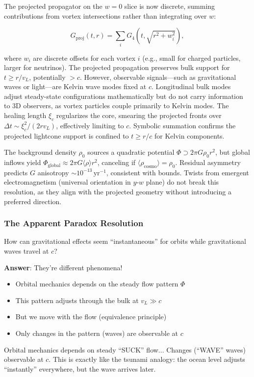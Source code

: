 The projected propagator on the $w=0$ slice is now discrete, summing contributions from vortex intersections rather than integrating over $w$:

\begin{equation}
G_{\text{proj}}(t, r) = \sum_i G_4(t, \sqrt{r^2 + w_i^2}),
\end{equation}

where $w_i$ are discrete offsets for each vortex $i$ (e.g., small for charged particles, larger for neutrinos). The projected propagation preserves bulk support for $t \geq r / v_L$, potentially $>c$. However, observable signals---such as gravitational waves or light---are Kelvin wave modes fixed at $c$. Longitudinal bulk modes adjust steady-state configurations mathematically but do not carry information to 3D observers, as vortex particles couple primarily to Kelvin modes. The healing length $\xi_c$ regularizes the core, smearing the projected fronts over $\Delta t \sim \xi_c^2 / (2 r v_L)$, effectively limiting to $c$. Symbolic summation confirms the projected lightcone support is confined to $t \geq r / c$ for Kelvin components.

The background density $\rho_0$ sources a quadratic potential $\Phi \supset 2\pi G \rho_0 r^2$, but global inflows yield $\Phi_{\text{global}} \approx 2\pi G \langle \rho \rangle r^2$, canceling if $\langle \rho_{\text{cosmo}} \rangle = \rho_0$. Residual asymmetry predicts $G$ anisotropy $\sim 10^{-13} \,\mathrm{yr}^{-1}$, consistent with bounds. Twists from emergent electromagnetism (universal orientation in $y$-$w$ plane) do not break this resolution, as they align with the projected geometry without introducing a preferred direction.

\subsubsection{The Apparent Paradox Resolution}

How can gravitational effects seem ``instantaneous'' for orbits while gravitational waves travel at $c$?

\textbf{Answer}: They're different phenomena!
\begin{itemize}
\item Orbital mechanics depends on the steady flow pattern $\Phi$
\item This pattern adjusts through the bulk at $v_L \gg c$
\item But we move with the flow (equivalence principle)
\item Only changes in the pattern (waves) are observable at $c$
\end{itemize}
Orbital mechanics depends on steady ``SUCK'' flow... Changes (``WAVE'' waves) observable at $c$. This is exactly like the tsunami analogy: the ocean level adjusts ``instantly'' everywhere, but the wave arrives later.


